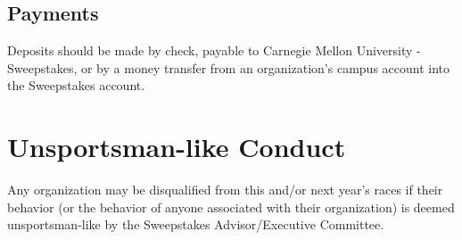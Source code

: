 \subsection{Payments}

	Deposits should be made by check, payable to Carnegie Mellon University -
	Sweepstakes, or by a money transfer from an organization's campus account into
	the Sweepstakes account.

\section{Unsportsman-like Conduct}

	Any organization may be disqualified from this and/or next year's races if
	their behavior (or the behavior of anyone associated with their organization)
	is deemed unsportsman-like by the Sweepstakes Advisor/Executive Committee.



